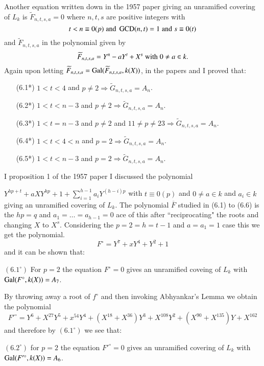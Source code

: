 Another equation written down in the 1957 paper giving an unramified covering of $L_{k}$ is $\widetilde{F}_{n,t,s,a}=0$ where $n,t,s$ are positive integers with
$$
t < n \equiv 0(p)\; {\rm and}\; \operatorname{GCD}(n,t)=1\; {\rm and}\; s \equiv 0(t) 
$$
and $\widetilde{F}_{n,t,s,a}$ in the polynomial given by
$$
\widetilde{F}_{n,t,s,a}=Y^{n}-aY^{t}+X^{s}\; {\rm with}\; 0\neq a \in k. 
$$
Again upon letting $\widetilde{F}_{n,t,s,a}=\operatorname{Gal}(\widetilde{F}_{n,t,s,a}, k(X))$, in the papers \cite{art1-key8} and \cite{art1-key10} I proved that:
\begin{itemize}
\item[{\rm (6.1*)}] $1 < t < 4$ and $p\neq 2 \Rightarrow \widetilde{G}_{n,t,s,a}= A_{n}$.
\item[{\rm (6.2*)}] $1 < t < n-3$ and $p \neq 2 \Rightarrow \widetilde{G}_{n,t,s,a}= A_{n}$.
\item[{\rm (6.3*)}] $1 < t = n-3$ and $p \neq 2$ and $11\neq p \neq 23 \Rightarrow \widetilde{G}_{n,t,s,a}= A_{n}$.
\item[{\rm (6.4*)}] $1 < t < 4 < n$ and $p = 2 \Rightarrow \widetilde{G}_{n,t,s,a}= A_{n}$.
\item[{\rm (6.5*)}] $1 < t < n-3$ and $p = 2 \Rightarrow \widetilde{G}_{n,t,s,a}= A_{n}$.
\end{itemize} 
I  proposition 1 of the 1957 paper I discussed the polynomial

$Y^{hp+t} +aXY^{hp} + 1 + \sum\limits_{i=1}^{h-1}a_{i}Y^{(h-i)p}$ with $t\equiv 0(p)$ and $0 \neq a \in k$  and $a_{i} \in k $ giving an unramified covering of $L_{k}$. The polynomial $\overline{F}$ studied in (6.1) to (6.6) is the $hp=q $ and $ a_{1}= \ldots = a_{h-1} =0$ ace of this after ``reciprocating" the roots and changing $X$ to $X^{s}$. Considering the $p=2 =h = t-1$ and $a = a_{1} = 1$ case this we get the polynomial. 
$$
F^{\circ} =Y^{7} +xY^{4}+Y^{2}+1
$$
and it can be shown that:

$(6.1^{\circ})$ For $p=2$ the equation $F^{\circ}=0$ gives an unramified coveing of $L_{k}$ with $\operatorname{Gal}(F^{\circ}, k(X))=A_{7}$.

By throwing away a root of $f^{\circ}$ and then invoking Abhyankar's Lemma we obtain the polynomial
$$ 
F'^{\circ} =Y^{6} +X^{27}Y^{5}+ x^{54}Y^{4} +(X^{18}+X^{36})Y^{3}+X^{108}Y^{2} +(X^{90}+X^{135})Y + X^{162}
$$
and therefore by $(6.1^{\circ})$ we see that:

$(6.2^{\circ})$ for $p=2$ the equation  $F'^{\circ}=0$ gives an unramified covering of $L_{k}$ with $\operatorname{Gal}(F'^{\circ}, k(X))=A_{6}$.

